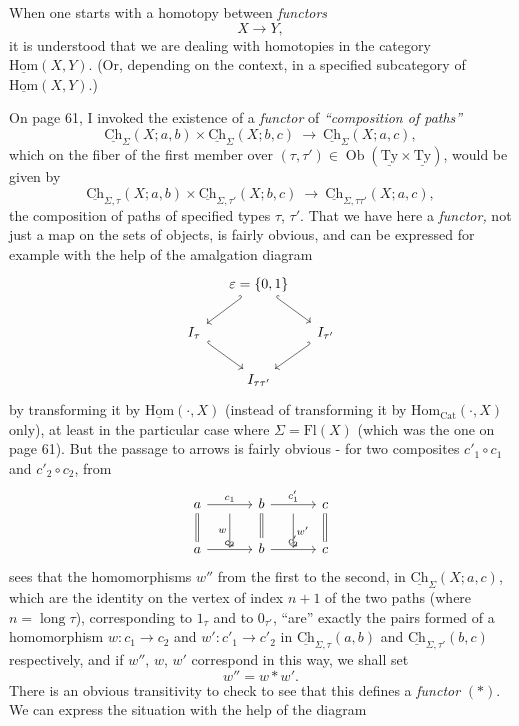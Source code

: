 \documentclass[11pt]{article}
\newcommand{\printedpage}[1]{\marginpar{\footnotesize p.~#1}}
\newcommand{\msp}[1]{\marginpar{\footnotesize [#1]}}
\newcommand{\Ch}{\underline{\mathrm{Ch}}}
\newcommand{\Ty}{\underline{\mathrm{Ty}}}
\newcommand{\uHom}{\underline{\mathrm{Hom}}}
\begin{document}
When one starts with a homotopy between \textit{functors}
\[
X \longrightarrow Y,
\]
it is understood that we are dealing with homotopies in the category $\uHom(X,Y)$. (Or, depending on the context, in a specified subcategory of $\uHom(X,Y)$.)

\msp{page 77}
On page 61, I invoked the existence of a \textit{functor} of \textit{``composition of paths''}
\[
\Ch_{\Sigma}(X;a,b)\times\Ch_{\Sigma}(X;b,c) \ \longrightarrow\ \Ch_{\Sigma}(X;a,c),
\]
which on the fiber of the first member over $(\tau,\tau') \in \operatorname{Ob}(\Ty\times\Ty)$, would be given by
\[
\Ch_{\Sigma,\tau}(X;a,b)\times\Ch_{\Sigma,\tau'}(X;b,c) \ \longrightarrow\ \Ch_{\Sigma,\tau\tau'}(X;a,c), \tag*{$(*)$}
\]
the composition of paths of specified types $\tau$, $\tau'$. That we have here a \textit{functor,} not just a map on the sets of objects, is fairly obvious, and can be expressed for example with the help of the amalgation diagram
\[
\begin{tikzcd}[column sep=small]
 & \varepsilon = \{0,1\} \ar[dl,hook'] \ar[dr,hook] & \\
I_{\tau} \ar[dr,hook] & & I_{\tau'} \ar[dl,hook'] \\
 & I_{\tau\tau'} &
\end{tikzcd}
\]
by transforming it by $\uHom(\cdot,X)$ (instead of transforming it by $\mathrm{Hom}_{\mathrm{Cat}}(\cdot,X)$ only), at least in the particular case where $\Sigma = \mathrm{Fl}(X)$ (which was the one on page 61). But the passage to arrows is fairly obvious - for two composites $c'_1\circ c_1$ and $c'_2\circ c_2$, from
\[
\begin{tikzcd}[column sep=small]
a \ar[rr,"c_1"] \ar[d,equal] & {} \ar[d,"w"'] & b \ar[rr,"c'_1"] \ar[d,equal] & {} \ar[d,"w'"] & c \ar[d,equal] \\
a \ar[rr,"c_2"] & {} & b \ar[rr,"c'_2"] & {} & c
\end{tikzcd}
\]
 sees that the homomorphisms $w''$ from the first to the second, in $\Ch_{\Sigma}(X;a,c)$, which are the identity on the vertex of index $n+1$ of the two paths (where $n = \operatorname{long}\tau$), corresponding to $1_{\tau}$ and to $0_{\tau'}$, ``are'' exactly the pairs
\printedpage{51}
\msp{page 78}
formed of a homomorphism $w : c_1 \longrightarrow c_2$ and $w' : c'_1 \longrightarrow c'_2$ in $\Ch_{\Sigma,\tau}(a,b)$ and $\Ch_{\Sigma,\tau'}(b,c)$ respectively, and if $w''$, $w$, $w'$ correspond in this way, we shall set
\[
w'' = w * w'.
\]
There is an obvious transitivity to check to see that this defines a \textit{functor} $(*)$. We can express the situation with the help of the diagram
\end{document}
